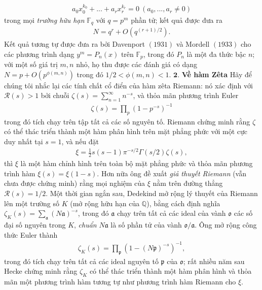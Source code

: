 \begin{multicols}{2}
	\begin{align*} 
		a_0x_0^{k_0} \!+\! ... \!+\! a_r x_r^{k_r} \!=\! 0 \ (a_0,...,a_r \neq 0)\tag{$3$}
	\end{align*}
	trong mọi \textit{trường hữu hạn} $\mathbb{F}_{q}$ với $q = p^m$ phần tử; kết quả được đưa ra
	\begin{align*}
		N = q^r + O(q^{(r+1)/2}). \tag{$4$}
	\end{align*}
	Kết quả tương tự được đưa ra bởi Davenport $(1931)$ và Mordell $(1933)$ cho các phương trình dạng $y^m = P_n(x)$ trên $\mathbb{F}_p$, trong đó $P_n$ là một đa thức bậc $n$; với một số giá trị $m,n$ nhỏ, họ thu được các đánh giá có dạng $N  = p + O(p^{\phi(m,n)})$ trong đó $1/2 < \phi(m,n) < 1$.
	\vskip 0.1cm
	$\pmb{2.}$ \textbf{\color{duongvaotoanhoc}Về hàm Zêta}
	\vskip 0.1cm
	Hãy để chúng tôi nhắc lại các tính chất cổ điển của hàm zêta Riemann: nó xác định với $\mathscr{R}(s) > 1$ bởi chuỗi $\zeta(s) = \sum_{n=1}^{\infty} n^{-s}$, và thỏa mãn phương trình Euler
	\begin{align*}
		\zeta(s) = \prod_p (1 - p^{-s})^{-1} \tag{$5$}
	\end{align*}
	trong đó tích chạy trên tập tất cả các số nguyên tố. Riemann chứng minh rằng $\zeta$ có thể thác triển thành một hàm phân hình trên mặt phẳng phức với một cực duy nhất tại $s=1$, và nếu đặt
	\begin{align*} 
		\xi = \frac{1}{2}s(s-1)\pi^{-s/2}\Gamma(s/2)\zeta(s),
	\end{align*}
	thì $\xi$ là một hàm chỉnh hình trên toàn bộ mặt phẳng phức và thỏa mãn phương trình hàm $\xi(s) = \xi(1-s)$. Hơn nữa ông đề xuất \textit{giả thuyết Riemann} (vẫn chưa được chứng minh) rằng mọi nghiệm của $\xi$ nằm trên đường thẳng $\mathscr{R}(s)=1/2$. 
	\vskip 0.1cm
	Một thời gian ngắn sau, Dedekind mở rộng lý thuyết của Riemann lên một trường số $K$ (mở rộng hữu hạn của $\mathbb{Q}$), bằng cách định nghĩa $\zeta_K(s) = \sum_{\mathfrak{a}}(N\mathfrak{a})^{-s}$, trong đó $\mathfrak{a}$ chạy trên tất cả các ideal của vành $\mathfrak{o}$ các số đại số nguyên trong $K$, \textit{chuẩn} $N\mathfrak{a}$ là số phần tử của vành $\mathfrak{o}/\mathfrak{a}$. Ông mở rộng công thức Euler thành
	\begin{align*}
		\zeta_K(s) = \prod_{\mathfrak{p}} (1-  (N\mathfrak{p})^{-s})^{-1}, \tag{$6$}
	\end{align*}
	trong đó tích chạy trên tất cả các ideal nguyên tố $\mathfrak{p}$ của $\mathfrak{o}$; rất nhiều năm sau Hecke chứng minh rằng $\zeta_K$ có thể thác triển thành một hàm phân hình và thỏa mãn một phương trình hàm tương tự như phương trình hàm Riemann cho $\xi$. 

\end{multicols}
